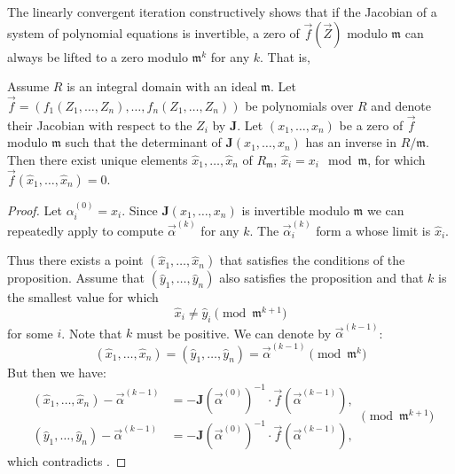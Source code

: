 {The linearly convergent iteration constructively shows that if the
Jacobian of a system of polynomial equations is invertible, a zero of
$\vec{f}(\vec{Z})$ modulo $\mathfrak{m}$ can always be lifted to a zero
modulo $\mathfrak{m}^k$ for any $k$.  That is,

\begin{proposition}\label{MNewton:Iter:Prop}
Assume $R$ is an integral domain with an ideal $\mathfrak{m}$.  Let
$\vec{f} = (f_1(Z_1, \ldots, Z_n), \ldots, f_n(Z_1, \ldots, Z_n))$ be
polynomials over $R$ and denote their Jacobian with respect to the
$Z_i$ by $\mathbf{J}$.  Let $(x_1, \ldots, x_n)$ be a zero of $\vec{f}$
modulo $\mathfrak{m}$ such that the determinant of $\mathbf{J}(x_1, \ldots,
x_n)$ has an inverse in $R/\mathfrak{m}$.  Then there exist unique
elements $\hat{x}_1, \ldots, \hat{x}_n$ of $R_\mathfrak{m}$, $\hat{x}_i =
x_i \mod\mathfrak{m}$, for which $\vec{f}(\hat{x}_1, \ldots, \hat{x}_n)
= 0$.
\end{proposition}

\begin{proof}
Let $\alpha_i^{(0)} = x_i$.  Since $\mathbf{J}(x_1, \ldots, x_n)$ is
invertible modulo $\mathfrak{m}$ we can repeatedly apply
 to compute $\vec{\alpha}^{(k)}$ for any
$k$.  The $\vec{\alpha}_i^{(k)}$ form a  whose
limit is $\hat{x}_i$.

Thus there exists a point $(\hat{x}_1, \ldots, \hat{x}_n)$ that
satisfies the conditions of the proposition.  Assume that $(\hat{y}_1, 
\ldots, \hat{y}_n)$ also satisfies the proposition and that $k$ is the 
smallest value for which 
\begin{equation} \label{MNewton:NotEq:Eq}
\hat{x}_i \not= \hat{y}_i \pmod{\mathfrak{m}^{k+1}}
\end{equation}
for some $i$. Note that $k$ must be positive. We can denote by
$\vec{\alpha}^{(k-1)}$:
\[
(\hat{x}_1, \ldots, \hat{x}_n) = (\hat{y}_1, \ldots, \hat{y}_n) =
\vec{\alpha}^{(k-1)} \pmod{\mathfrak{m}^k}
\]
But then we have:
\[
\begin{aligned}
(\hat{x}_1, \ldots, \hat{x}_n) - \vec{\alpha}^{(k-1)}
   &= -\mathbf{J}(\vec{\alpha}^{(0)})^{-1} 
  \cdot \vec{f}(\vec{\alpha}^{(k-1)}), \\
(\hat{y}_1, \ldots, \hat{y}_n) - \vec{\alpha}^{(k-1)}
   &= -\mathbf{J}(\vec{\alpha}^{(0)})^{-1} 
  \cdot \vec{f}(\vec{\alpha}^{(k-1)}),
\end{aligned}
\pmod{\mathfrak{m}^{k+1}}
\]
which contradicts .
\end{proof}

}
